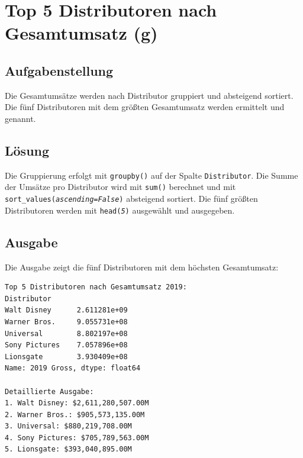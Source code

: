 \cleardoublepage


\section{Top 5 Distributoren nach Gesamtumsatz (g)}
\label{sec:1g}

\subsection{Aufgabenstellung}

Die Gesamtumsätze werden nach Distributor gruppiert und absteigend sortiert. Die fünf Distributoren mit dem größten Gesamtumsatz werden ermittelt und genannt.

\subsection{Lösung}

Die Gruppierung erfolgt mit \texttt{groupby()} auf der Spalte \texttt{Distributor}. Die Summe der Umsätze pro Distributor wird mit \texttt{sum()} berechnet und mit \texttt{sort\_values(\textit{ascending=False})} absteigend sortiert. Die fünf größten Distributoren werden mit \texttt{head(\textit{5})} ausgewählt und ausgegeben.



\subsection{Ausgabe}

Die Ausgabe zeigt die fünf Distributoren mit dem höchsten Gesamtumsatz:

\begin{verbatim}
Top 5 Distributoren nach Gesamtumsatz 2019:
Distributor
Walt Disney      2.611281e+09
Warner Bros.     9.055731e+08
Universal        8.802197e+08
Sony Pictures    7.057896e+08
Lionsgate        3.930409e+08
Name: 2019 Gross, dtype: float64

Detaillierte Ausgabe:
1. Walt Disney: $2,611,280,507.00M
2. Warner Bros.: $905,573,135.00M
3. Universal: $880,219,708.00M
4. Sony Pictures: $705,789,563.00M
5. Lionsgate: $393,040,895.00M
\end{verbatim}

